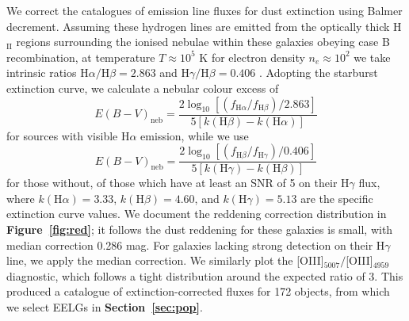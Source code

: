 \documentclass[fleqn,usenatbib]{mnras}
\begin{document}
We correct the catalogues of emission line fluxes for dust extinction using Balmer decrement. Assuming these hydrogen lines are emitted from the optically thick H$_{\mathrm{II}}$ regions surrounding the ionised nebulae within these galaxies obeying case B recombination, at temperature $T\approx10^{5}$ K for electron density $n_e\approx10^2$ we take intrinsic ratios $\mathrm{H}\alpha/\mathrm{H}\beta=2.863$ and $\mathrm{H}\gamma/\mathrm{H}\beta=0.406$ \citep{osterbrock}. Adopting the \cite{calzetti} starburst extinction curve, we calculate a nebular colour excess of 
\begin{equation}
E(B-V)_{\mathrm{neb}} =  \frac{ 2\log_{10} [(f_{\mathrm{H}\alpha }/f_{\mathrm{H}\beta})/2.863]}{5[k(\mathrm{H}\beta)-k(\mathrm{H}\alpha)]}
\end{equation}
for sources with visible $\mathrm{H}\alpha$ emission, while we use
\begin{equation}
E(B-V) _{\mathrm{neb}}  =  \frac{ 2\log_{10} [(f_{\mathrm{H}\beta }/f_{\mathrm{H}\gamma })/0.406]}{5[k(\mathrm{H}\gamma)-k(\mathrm{H}\beta)]}
\end{equation}
for those without, of those which have at least an SNR of 5 on their $\mathrm{H}\gamma$ flux, where $k(\mathrm{H}\alpha)=3.33$, $k(\mathrm{H}\beta)=4.60$, and $k(\mathrm{H}\gamma)=5.13$ are the specific extinction curve values. We document the reddening correction distribution in \textbf{Figure~\ref{fig:red}}; it follows the dust reddening for these galaxies is small, with median correction 0.286 mag. For galaxies lacking strong detection on their $\mathrm{H}\gamma$ line, we apply the median correction. We similarly plot the [OIII]$_{5007}/$[OIII]$_{4959}$ diagnostic, which follows a tight distribution around the expected ratio of $3$. This produced a catalogue of extinction-corrected fluxes for 172 objects, from which we select EELGs in \textbf{Section~\ref{sec:pop}}.
\end{document}
